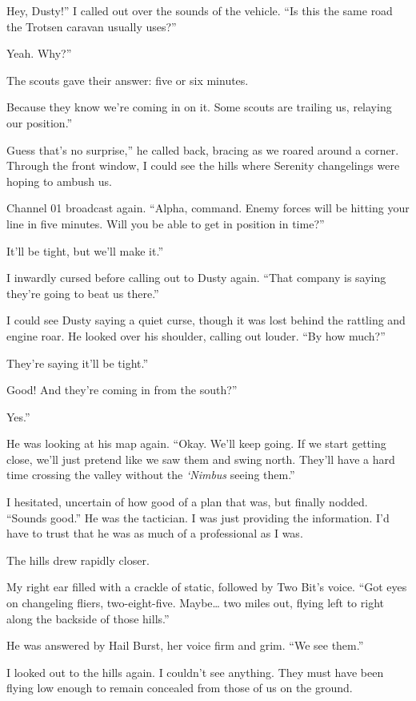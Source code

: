 \leavevmode{}Hey, Dusty!” I called out over the sounds of the vehicle. “Is this the same road the Trotsen caravan usually uses?”

\leavevmode{}Yeah. Why?”

The scouts gave their answer: five or six minutes.

\leavevmode{}Because they know we’re coming in on it. Some scouts are trailing us, relaying our position.”

\leavevmode{}Guess that’s no surprise,” he called back, bracing as we roared around a corner. Through the front window, I could see the hills where Serenity changelings were hoping to ambush us.

Channel 01 broadcast again. “Alpha, command. Enemy forces will be hitting your line in five minutes. Will you be able to get in position in time?”

\leavevmode{}It’ll be tight, but we’ll make it.”

I inwardly cursed before calling out to Dusty again. “That company is saying they’re going to beat us there.”

I could see Dusty saying a quiet curse, though it was lost behind the rattling and engine roar. He looked over his shoulder, calling out louder. “By how much?”

\leavevmode{}They’re saying it’ll be tight.”

\leavevmode{}Good! And they’re coming in from the south?”

\leavevmode{}Yes.”

He was looking at his map again. “Okay. We’ll keep going. If we start getting close, we’ll just pretend like we saw them and swing north. They’ll have a hard time crossing the valley without the \textit{‘Nimbus} seeing them.”

I hesitated, uncertain of how good of a plan that was, but finally nodded. “Sounds good.” He was the tactician. I was just providing the information. I’d have to trust that he was as much of a professional as I was.

The hills drew rapidly closer.

My right ear filled with a crackle of static, followed by Two Bit’s voice. “Got eyes on changeling fliers, two-eight-five. Maybe… two miles out, flying left to right along the backside of those hills.”

He was answered by Hail Burst, her voice firm and grim. “We see them.”

I looked out to the hills again. I couldn’t see anything. They must have been flying low enough to remain concealed from those of us on the ground.

